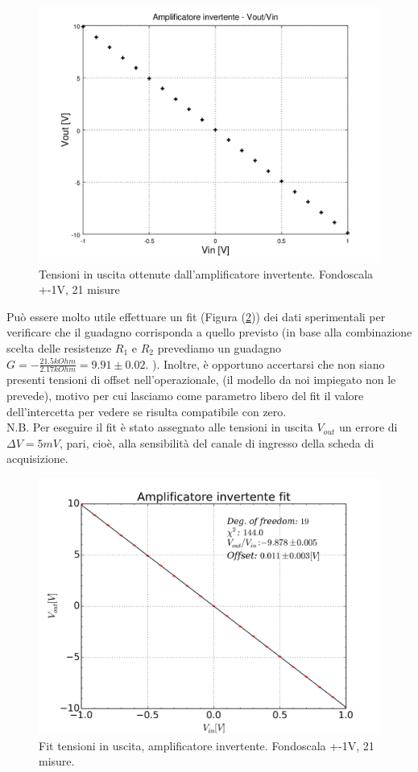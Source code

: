 \documentclass[journal, a4paper]{IEEEtran}
\begin{document}
\begin{figure}
\centering
\includegraphics[width=0.9\linewidth]{./V_ripetuti_-1+1_21mis}
\caption{Tensioni in uscita ottenute dall'amplificatore invertente. Fondoscala +-1V, 21 misure}
\label{fig:V_ripetuti_-1+1_21mis}
\end{figure}

Può essere molto utile effettuare un fit (Figura (\ref{fig:fit_V_ripetuti_21mis})) dei dati sperimentali per verificare che il guadagno corrisponda a quello previsto (in base alla combinazione scelta delle resistenze $R_1$ e $R_2$ prevediamo un guadagno $G = -\frac{21.5 \si{kOhm}}{2.17 \si{kOhm}} = 9.91 \pm 0.02 $. ). Inoltre, è opportuno accertarsi che non siano presenti tensioni di offset nell'operazionale, (il modello da noi impiegato non le prevede), motivo per cui lasciamo come parametro libero del fit il valore dell'intercetta per vedere se risulta compatibile con zero. \\

N.B. Per eseguire il fit è stato assegnato alle tensioni in uscita $V_{out}$ un errore di $\Delta V = 5 \si{mV}$, pari, cioè, alla sensibilità del canale di ingresso della scheda di acquisizione. \\


\begin{figure}
\centering
\includegraphics[width=0.9\linewidth]{./fit_V_ripetuti_21mis}
\caption{Fit tensioni in uscita, amplificatore invertente. Fondoscala +-1V, 21 misure.}
\label{fig:fit_V_ripetuti_21mis}
\end{figure}
\end{document}
